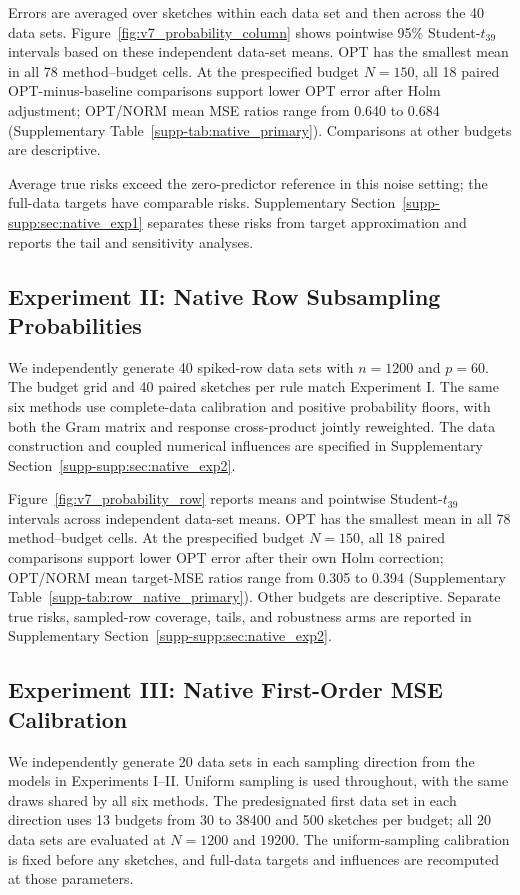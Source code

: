 \documentclass[pdflatex,iicol,sn-mathphys-ay]{sn-jnl}
\theoremstyle{thmstyleone}
\theoremstyle{thmstylethree}
\theoremstyle{thmstyletwo}
\begin{document}
Errors are averaged over sketches within each data set and then across the
40 data sets. Figure~\ref{fig:v7_probability_column} shows pointwise 95\%
Student-$t_{39}$ intervals based on these independent data-set means.
OPT has the smallest mean in all 78 method--budget cells. At the prespecified
budget $N=150$, all 18 paired OPT-minus-baseline comparisons support lower
OPT error after Holm adjustment; OPT/NORM mean MSE ratios range from
0.640 to 0.684 (Supplementary Table~\ref{supp-tab:native_primary}).
Comparisons at other budgets are descriptive.


Average true risks exceed the zero-predictor reference in this noise
setting; the full-data targets have comparable risks.
Supplementary Section~\ref{supp-supp:sec:native_exp1} separates these risks
from target approximation and reports the tail and sensitivity analyses.

\subsection{Experiment II: Native Row Subsampling Probabilities}
\label{subsec:exp_row_probabilities}
We independently generate 40 spiked-row data sets with $n=1200$ and $p=60$.
The budget grid and 40 paired sketches per rule match Experiment I.
The same six methods use complete-data calibration and positive probability
floors, with both the Gram matrix and response cross-product jointly
reweighted. The data construction and coupled numerical influences are
specified in Supplementary Section~\ref{supp-supp:sec:native_exp2}.

Figure~\ref{fig:v7_probability_row} reports means and pointwise
Student-$t_{39}$ intervals across independent data-set means.
OPT has the smallest mean in all 78 method--budget cells.
At the prespecified budget $N=150$, all 18 paired comparisons support lower
OPT error after their own Holm correction; OPT/NORM mean target-MSE ratios
range from 0.305 to 0.394
(Supplementary Table~\ref{supp-tab:row_native_primary}).
Other budgets are descriptive. Separate true risks, sampled-row coverage,
tails, and robustness arms are reported in Supplementary
Section~\ref{supp-supp:sec:native_exp2}.


\subsection{Experiment III: Native First-Order MSE Calibration}
\label{subsec:v7_mse}
We independently generate 20 data sets in each sampling direction from the
models in Experiments I--II. Uniform sampling is used throughout, with the
same draws shared by all six methods. The predesignated first data set in
each direction uses 13 budgets from 30 to 38400 and 500 sketches per budget;
all 20 data sets are evaluated at $N=1200$ and $19200$.
The uniform-sampling calibration is fixed before any sketches, and full-data
targets and influences are recomputed at those parameters.
\end{document}
